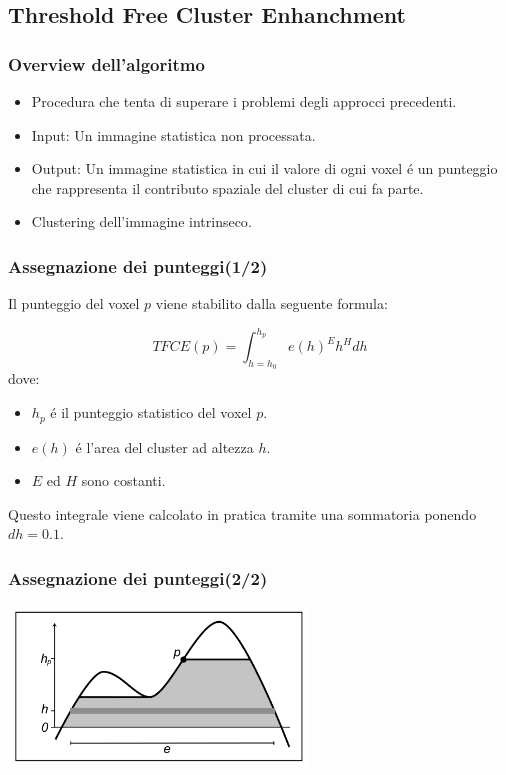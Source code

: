 \documentclass{beamer}
\begin{document}
\subsection{Threshold Free Cluster Enhanchment}

\begin{frame}
\frametitle{Overview dell'algoritmo}
\begin{itemize}
\item Procedura che tenta di superare i problemi degli approcci precedenti.
\item Input: Un immagine statistica non processata.
\item Output: Un immagine statistica in cui il valore di ogni voxel \'e un \alert{punteggio} che rappresenta il contributo spaziale del cluster di cui fa parte.
\end{itemize}
\vfill
\begin{itemize}
\item Clustering dell'immagine \alert{intrinseco}.
\end{itemize}
\end{frame}

\begin{frame}
\frametitle{Assegnazione dei punteggi(1/2)}
Il punteggio del voxel $p$ viene stabilito dalla seguente formula:

$$TFCE(p)=\int_{h=h_0}^{h_p}e(h)^E h^H dh$$
dove:
\begin{itemize}
\item $h_p$ \'e il punteggio statistico del voxel $p$.
\item $e(h)$ \'e l'area del cluster ad altezza $h$.
\item $E$ ed $H$ sono costanti.
\end{itemize}
\vfill
Questo integrale viene calcolato in pratica tramite una sommatoria ponendo $dh = 0.1$.

\end{frame}

\begin{frame}
\frametitle{Assegnazione dei punteggi(2/2)}
\includegraphics[width=300px]{Images/TFCE.png}
\end{frame}
\end{document}

